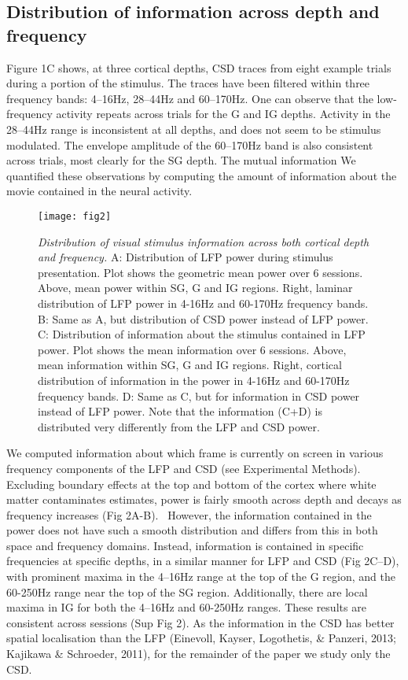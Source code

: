 \subsection[Distribution of information across depth and frequency]{Distribution of information across depth and frequency}
Figure 1C shows, at three cortical depths, \ac{CSD} traces from eight example trials during a portion of the stimulus.
The traces have been filtered within three frequency bands: 4--16Hz, 28--44Hz and 60--170Hz.
One can observe that the low-frequency activity repeats across trials for the \ac{G} and \ac{IG} depths.
Activity in the 28--44Hz range is inconsistent at all depths, and does not seem to be stimulus modulated.
The envelope amplitude of the 60--170Hz band is also consistent across trials, most clearly for the \ac{SG} depth.
The mutual information We quantified these observations by computing the amount of information about the movie contained in the neural activity.

\begin{figure}[htbp]
\centering \texttt{[image: fig2]}
%
\caption{%
\textit{Distribution of visual stimulus information across both cortical depth 
and frequency.}
A: Distribution of \ac{LFP} power during stimulus presentation.
Plot shows the geometric mean 
power over 6 sessions.
Above, mean power within \ac{SG}, \ac{G} and \ac{IG} regions.
Right, laminar distribution of \ac{LFP} power in
4-16Hz and 60-170Hz frequency bands.
B: Same as A, but distribution of \ac{CSD} power instead of \ac{LFP} power.
C: Distribution of information about the stimulus contained in \ac{LFP} power.
Plot 
shows the mean information over 6 sessions.
Above, mean information within \ac{SG}, \ac{G} 
and \ac{IG} regions.
Right, cortical distribution of information in the power in
4-16Hz and 60-170Hz frequency bands.
D: Same as C, but for information in \ac{CSD} power instead of \ac{LFP} power.
Note that the information (C+D) is distributed very differently from the \ac{LFP} and \ac{CSD} power.}%
\label{fig:lam_2}
\end{figure}

We computed information about which frame is currently on screen in various frequency components of the \ac{LFP} and \ac{CSD} (see Experimental Methods).
Excluding boundary effects at the top and bottom of the cortex where white matter contaminates estimates, power is fairly smooth across depth and decays as frequency increases (Fig 2A-B).
\ However, the information contained in the power does not have such a smooth distribution and differs from this in both space and frequency domains.
Instead, information is contained in specific frequencies at specific depths, in a similar manner for \ac{LFP} and \ac{CSD} (Fig 2C--D), with prominent maxima in the 4--16Hz range at the top of the \ac{G} region, and the 60-250Hz range near the top of the \ac{SG} region.
Additionally, there are local maxima in \ac{IG} for both the 4--16Hz and 60-250Hz ranges.
These results are consistent across sessions (Sup Fig 2).
As the information in the \ac{CSD} has better spatial localisation than the \ac{LFP} (Einevoll, Kayser, Logothetis, \& Panzeri, 2013; Kajikawa \& Schroeder, 2011), for the remainder of the paper we study only the \ac{CSD}.

